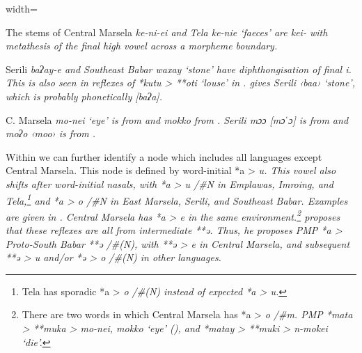 \begin{table}
\begin{adjustbox}{width=\textwidth}
\begin{threeparttable}
\begin{tablenotes}
			\item[†]	{The stems of Central Marsela \it{ke-ni-ei}
								and Tela \it{ke-nie} ‘faeces’ are \it{kei-} with metathesis of
								the final high vowel across a morpheme boundary.}
			\item[‡]	{Serili \it{baʔay-e}
								and Southeast Babar \it{waxay} ‘stone’ have diphthongisation
								of final \it{i}.
								This is also seen in reflexes of *kutu > **oti ‘louse’ in .
								\citet[158]{vanDijk2021} gives Serili ‹baa› ‘stone’,
								which is probably phonetically [baʔa].}
			\item[Δ]	{C. Marsela \it{mo-nei} `eye' is from \citet[414]{Taber1993}
								and \it{mokko} from \citet[163]{vanDijk2021}.
								Serili \it{mɔɔ} [mɔˈɔ] is from \citet[414]{Taber1993}
								and \it{moʔo} ‹mo{\Q}o› is from \citet[163]{vanDijk2021}.}
		\end{tablenotes}
	\end{threeparttable}
\end{adjustbox}
\end{table}

Within  we can further identify a  node which includes all languages except Central Marsela.
This node is defined by word-initial *a > \it{u}.
This vowel also shifts after word-initial nasals,
with *a > \it{u} /{\#}N{\gap} in Emplawas,
Imroing, and Tela,\footnote{
Tela has sporadic *a > \it{o} /{\#}(N){\gap}
instead of expected *a > \it{u}.} 
and *a > \it{o} /{\#}N{\gap} in East Marsela,
Serili, and Southeast Babar.
Examples are given in .
Central Marsela has *a > \it{e} in the same environment.\footnote{
		There are two words in which Central Marsela has
		*a > \it{o} /{\#}m{\gap}.
		PMP *mata > **muka > \it{mo-nei},
		\it{mokko} ‘eye’ (),
		and *matay > **muki > \it{n-mokei} ‘die’.}
\citet{Zobel2018} proposes that these reflexes are all from intermediate **ə.
Thus, he proposes PMP *a > Proto-South Babar **ə /{\#}(N){\gap},
with **ə > \it{e} in Central Marsela,
and subsequent **ə > \it{u} and/or *ə > \it{o} /{\#}(N){\gap} in other languages.

